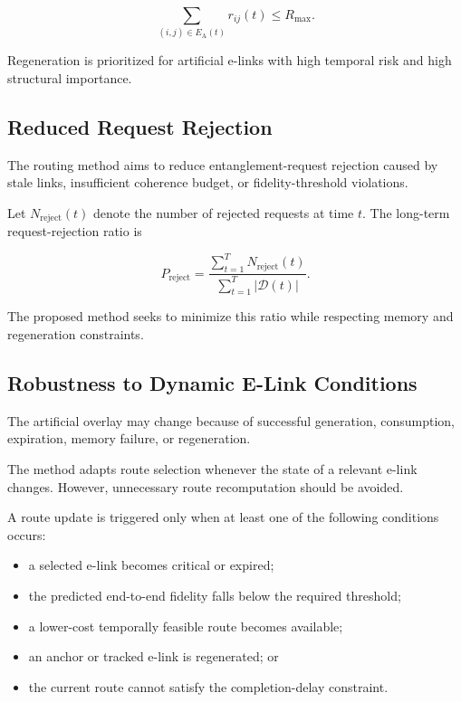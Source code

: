 \begin{equation}
    \sum_{
    (i,j)
    \in
    E_{\mathrm{A}}(t)
    }
    r_{ij}(t)
    \leq
    R_{\max}.
\end{equation}

Regeneration is prioritized for artificial e-links with high temporal risk and high structural importance.

\subsection{Reduced Request Rejection}

The routing method aims to reduce entanglement-request rejection caused by stale links, insufficient coherence budget, or fidelity-threshold violations.

Let $N_{\mathrm{reject}}(t)$ denote the number of rejected requests at time $t$. The long-term request-rejection ratio is

\begin{equation}
    P_{\mathrm{reject}}
    =
    \frac{
    \sum_{t=1}^{T}
    N_{\mathrm{reject}}(t)
    }{
    \sum_{t=1}^{T}
    |\mathcal{D}(t)|
    }.
\end{equation}

The proposed method seeks to minimize this ratio while respecting memory and regeneration constraints.

\subsection{Robustness to Dynamic E-Link Conditions}

The artificial overlay may change because of successful generation, consumption, expiration, memory failure, or regeneration.

The method adapts route selection whenever the state of a relevant e-link changes. However, unnecessary route recomputation should be avoided.

A route update is triggered only when at least one of the following conditions occurs:

\begin{itemize}
    \item a selected e-link becomes critical or expired;
    \item the predicted end-to-end fidelity falls below the required threshold;
    \item a lower-cost temporally feasible route becomes available;
    \item an anchor or tracked e-link is regenerated; or
    \item the current route cannot satisfy the completion-delay constraint.
\end{itemize}

